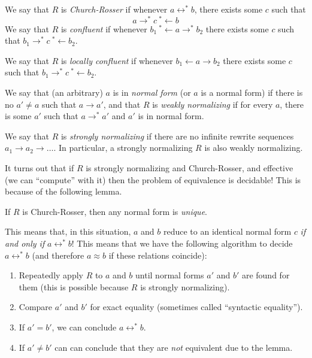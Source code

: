 \begin{definition}
  We say that $R$ is \emph{Church-Rosser} if whenever $a\leftrightarrow^* b$, there exists some $c$ such that
  \[a\rightarrow^* c\ {}^*\leftarrow b\]
  We say that $R$ is \emph{confluent} if whenever $b_1\ {}^*\leftarrow a\rightarrow^* b_2$ there exists some $c$ such that $b_1\rightarrow^* c\ {}^*\leftarrow b_2$.

  We say that $R$ is \emph{locally confluent} if whenever $b_1\leftarrow a\rightarrow b_2$ there exists some $c$ such that $b_1\rightarrow^* c\ {}^*\leftarrow b_2$.

  We say that (an arbitrary) $a$ is in \emph{normal form} (or $a$ is a normal form) if there is no $a' \neq a$ such that $a \rightarrow a'$, and that $R$ is \emph{weakly normalizing} if for every $a$, there is some $a'$ such that $a\rightarrow^*a'$ and $a'$ is in normal form.

  We say that $R$ is \emph{strongly normalizing} if there are no infinite rewrite sequences $a_1\rightarrow a_2\rightarrow \ldots$. In particular, a strongly normalizing $R$ is also weakly normalizing.
\end{definition}

It turns out that if $R$ is strongly normalizing and Church-Rosser, and effective (we can ``compute'' with it) then the problem of equivalence is decidable! This is because of the following lemma.

\begin{lemma}
  If $R$ is Church-Rosser, then any normal form is \emph{unique}.
\end{lemma}

This means that, in this situation, $a$ and $b$ reduce to an identical normal form $c$ \emph{if and only if} $a\leftrightarrow^* b$! This means that we have the following algorithm to decide $a\leftrightarrow^* b$ (and therefore $a\approx b$ if these relations coincide):
\begin{enumerate}
  \item Repeatedly apply $R$ to $a$ and $b$ until normal forms $a'$ and $b'$ are found for them (this is possible because $R$ is strongly normalizing).
  \item Compare $a'$ and $b'$ for exact equality (sometimes called ``syntactic equality'').
  \item If $a' = b'$, we can conclude $a\leftrightarrow^* b$.
  \item If $a' \neq b'$ can can conclude that they are \emph{not} equivalent due to the lemma.
\end{enumerate}

